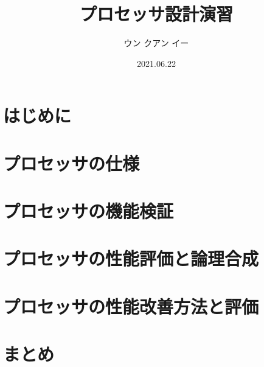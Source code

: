 \documentclass[a4paper, 10pt]{jsarticle}
\title{プロセッサ設計演習}
\author{ウン クアン イー}
\date{2021.06.22}
\begin{document}
  
  \maketitle

  \section{はじめに}
  

  \section{プロセッサの仕様}
  

  \section{プロセッサの機能検証}
  

  \section{プロセッサの性能評価と論理合成}
  

  \section{プロセッサの性能改善方法と評価}
  

  \section{まとめ}
  

  \cite{riscv-reader}
  \cite{ca-quantitative-approach}

  
  
\end{document}
